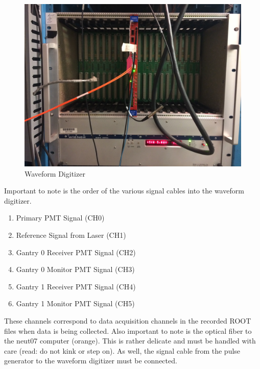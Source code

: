\documentclass[twoside,letterpaper]{refart}
\newcommand{\picwidth}{0.7 \textwidth}
\begin{document}
\begin{figure}[!htpb]\centering	
	\includegraphics[width=\picwidth]{images/digiCrate}
	\caption{Waveform Digitizer\label{wvDigi}}
\end{figure}

\FloatBarrier

Important to note is the order of the various signal cables into the waveform digitizer.

\begin{enumerate}
	
	\item Primary PMT Signal (CH0)
	\item Reference Signal from Laser (CH1)
	\item Gantry 0 Receiver PMT Signal (CH2)
	\item Gantry 0 Monitor PMT Signal (CH3)
	\item Gantry 1 Receiver PMT Signal (CH4)
	\item Gantry 1 Monitor PMT Signal (CH5)
	
\end{enumerate}

These channels correspond to data acquisition channels in the recorded ROOT files when data is being collected. Also important to note is the optical fiber to the neut07 computer (orange). This is rather delicate and must be handled with care (read: do not kink or step on). As well, the signal cable from the pulse generator to the waveform digitizer must be connected.

\FloatBarrier
\end{document}
